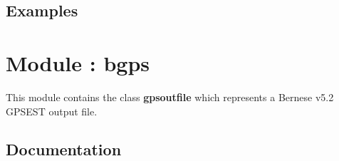 \documentclass[letterpaper,10pt,english]{sphinxmanual}
\begin{document}
\section{Examples}
\label{bcrd:examples}

\chapter{Module : bgps}
\label{bgps:module-bgps}\label{bgps::doc}
This module contains the class \textbf{gpsoutfile} which represents a Bernese v5.2
GPSEST output file.


\section{Documentation}
\label{bgps:documentation}
\end{document}
